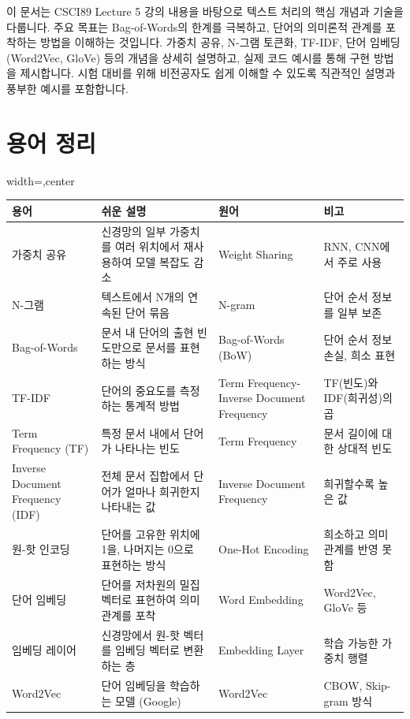 \documentclass[11pt,a4paper]{article}
\begin{document}
\begin{tcolorbox}[mybox, title=개요]
이 문서는 CSCI89 Lecture 5 강의 내용을 바탕으로 텍스트 처리의 핵심 개념과 기술을 다룹니다.
주요 목표는 Bag-of-Words의 한계를 극복하고, 단어의 의미론적 관계를 포착하는 방법을 이해하는 것입니다.
가중치 공유, N-그램 토큰화, TF-IDF, 단어 임베딩(Word2Vec, GloVe) 등의 개념을 상세히 설명하고,
실제 코드 예시를 통해 구현 방법을 제시합니다.
시험 대비를 위해 비전공자도 쉽게 이해할 수 있도록 직관적인 설명과 풍부한 예시를 포함합니다.
\end{tcolorbox}

\newpage
\section*{용어 정리}
\begin{adjustbox}{width=\textwidth,center}
\begin{tabular}{llll}
\toprule
\textbf{용어} & \textbf{쉬운 설명} & \textbf{원어} & \textbf{비고} \\
\midrule
가중치 공유 & 신경망의 일부 가중치를 여러 위치에서 재사용하여 모델 복잡도 감소 & Weight Sharing & RNN, CNN에서 주로 사용 \\
N-그램 & 텍스트에서 N개의 연속된 단어 묶음 & N-gram & 단어 순서 정보를 일부 보존 \\
Bag-of-Words & 문서 내 단어의 출현 빈도만으로 문서를 표현하는 방식 & Bag-of-Words (BoW) & 단어 순서 정보 손실, 희소 표현 \\
TF-IDF & 단어의 중요도를 측정하는 통계적 방법 & Term Frequency-Inverse Document Frequency & TF(빈도)와 IDF(희귀성)의 곱 \\
Term Frequency (TF) & 특정 문서 내에서 단어가 나타나는 빈도 & Term Frequency & 문서 길이에 대한 상대적 빈도 \\
Inverse Document Frequency (IDF) & 전체 문서 집합에서 단어가 얼마나 희귀한지 나타내는 값 & Inverse Document Frequency & 희귀할수록 높은 값 \\
원-핫 인코딩 & 단어를 고유한 위치에 1을, 나머지는 0으로 표현하는 방식 & One-Hot Encoding & 희소하고 의미 관계를 반영 못함 \\
단어 임베딩 & 단어를 저차원의 밀집 벡터로 표현하여 의미 관계를 포착 & Word Embedding & Word2Vec, GloVe 등 \\
임베딩 레이어 & 신경망에서 원-핫 벡터를 임베딩 벡터로 변환하는 층 & Embedding Layer & 학습 가능한 가중치 행렬 \\
Word2Vec & 단어 임베딩을 학습하는 모델 (Google) & Word2Vec & CBOW, Skip-gram 방식 \\

\end{tabular}
\end{adjustbox}
\end{document}
